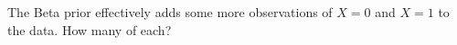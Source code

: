 \documentclass[a4paper,10pt,landscape,twocolumn]{scrartcl}
\begin{document}
\begin{exercise}
	\begin{subex}
		The Beta prior effectively adds some more observations of $X=0$ and $X=1$ to the data. How many of each? 
	\end{subex}



\end{exercise}
\end{document}
